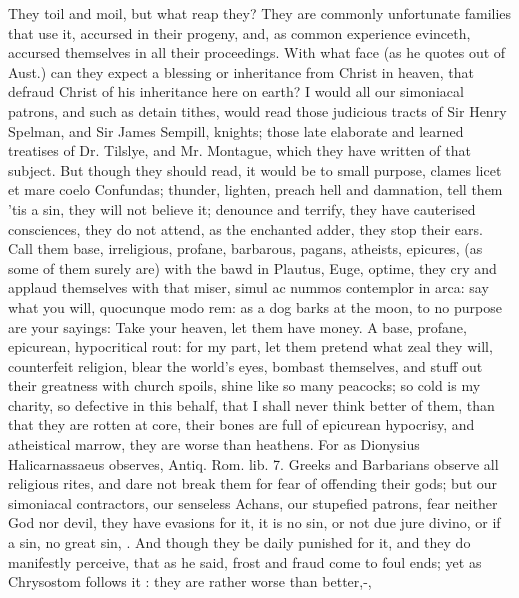 {They toil and moil, but what reap they? They are commonly unfortunate
families that use it, accursed in their pro\-geny, and, as common
experience evinceth, accursed themselves in all their proceedings. With
what face (as he quotes out of Aust.) can they expect a blessing
or inheritance from Christ in heaven, that defraud Christ of his
inheritance here on earth? I would all our simoniacal patrons, and such
as detain tithes, would read those judicious tracts of Sir Henry
Spelman, and Sir James Sempill, knights; those late elaborate and
learned treatises of Dr. Tilslye, and Mr. Montague, which they have
written of that subject. But though they should read, it would be to
small purpose, clames licet et mare coelo Confundas; thunder, lighten,
preach hell and damnation, tell them 'tis a sin, they will not believe
it; denounce and terrify, they have cauterised consciences, they
do not attend, as the enchanted adder, they stop their ears. Call them
base, irreligious, profane, barbarous, pagans, atheists, epicures, (as
some of them surely are) with the bawd in Plautus, Euge, optime, they
cry and applaud themselves with that miser, simul ac nummos
contemplor in arca: say what you will, quocunque modo rem: as a dog
barks at the moon, to no purpose are your sayings: Take your heaven,
let them have money. A base, profane, epicurean, hypocritical rout: for
my part, let them pretend what zeal they will, counterfeit religion,
blear the world's eyes, bombast themselves, and stuff out their
greatness with church spoils, shine like so many peacocks; so cold is
my charity, so defective in this behalf, that I shall never think
better of them, than that they are rotten at core, their bones are full
of epicurean hypocrisy, and atheistical marrow, they are worse than
heathens. For as Dionysius Halicarnassaeus observes, Antiq. Rom. lib.
7.  Greeks and Barbarians observe all religious
rites, and dare not break them for fear of offending their gods; but
our simoniacal contractors, our senseless Achans, our stupefied
patrons, fear neither God nor devil, they have evasions for it, it is
no sin, or not due jure divino, or if a sin, no great sin, \etc{}. And
though they be daily punished for it, and they do manifestly perceive,
that as he said, frost and fraud come to foul ends; yet as
Chrysostom follows it :
they are rather worse than better,-,
}
